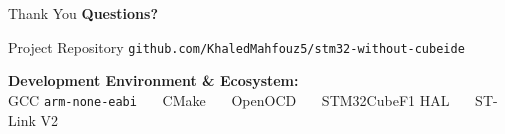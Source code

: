 \documentclass[10pt]{beamer}
\begin{document}
\begin{frame}{Thank You}
    \centering
    \vfill
    {\Large\color{darkcyan}\textbf{Questions?}}
    \vfill
    
    \begin{block}{Project Repository}
        \centering
        \texttt{github.com/KhaledMahfouz5/stm32-without-cubeide}
    \end{block}
    
    \vfill
    
    \small
    \textbf{Development Environment \& Ecosystem:} \\
    \medskip
    GCC \texttt{arm-none-eabi} \ \textperiodcentered \ \ CMake \ \textperiodcentered \ \ OpenOCD \ \textperiodcentered \ \ STM32CubeF1 HAL \ \textperiodcentered \ \ ST-Link V2
    \vfill
\end{frame}
\end{document}
